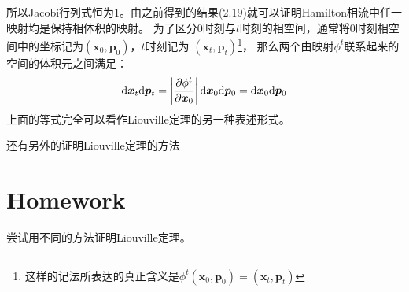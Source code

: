     所以Jacobi行列式恒为1。由之前得到的结果(2.19)就可以证明Hamilton相流中任一映射均是保持相体积的映射。
    为了区分0时刻与$t$时刻的相空间，通常将0时刻相空间中的坐标记为$(\bm{x}_0, \bm{p}_0)$，$t$时刻记为
    $(\bm{x}_t,\bm{p}_{t})$\footnote{这样的记法所表达的真正含义是$\phi^t(\bm{x}_0, \bm{p}_0) = (\bm{x}_t, \bm{p}_t)$}，
    那么两个由映射$\phi^t$联系起来的空间的体积元之间满足：
    \begin{equation}
        \mathrm{d}\bm{x}_t \mathrm{d}\bm{p}_t = \left|\frac{\partial{\phi^t}}{\partial{\bm{x}_0}}\right|\mathrm{d}\bm{x}_0 \mathrm{d}\bm{p}_0 = \mathrm{d} \bm{x}_0\mathrm{d} \bm{p}_0
    \end{equation}
    上面的等式完全可以看作Liouville定理的另一种表述形式。
    \par
    还有另外的证明Liouville定理的方法
    
    \section{Homework}
    \begin{asg}
        尝试用不同的方法证明Liouville定理。
    \end{asg}


    
    